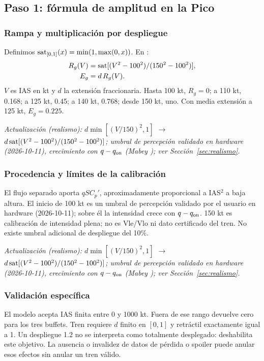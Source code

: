 \subsection{Paso 1: fórmula de amplitud en la Pico}
\subsubsection{Rampa y multiplicación por despliegue}
Definimos $\operatorname{sat}_{[0,1]}(x)=\min(1,\max(0,x))$. En :
\begin{align}
R_g(V)&=\operatorname{sat}[(V^2-100^2)/(150^2-100^2)],\\
E_g&=d\,R_g(V).
\label{eq:gear-env}
\end{align}
$V$ es IAS en kt y $d$ la extensión fraccionaria. Hasta 100 kt, $R_g=0$; a 110 kt, 0.168; a 125 kt, 0.45; a 140 kt, 0.768; desde 150 kt, uno. Con media extensión a 125 kt, $E_g=0.225$.

\textit{Actualización (realismo): $d\min[(V/150)^2,1]$ $\rightarrow$ $d\operatorname{sat}[(V^2-100^2)/(150^2-100^2)]$; umbral de percepción validado en hardware (2026-10-11), crecimiento con $q-q_{\rm on}$ (Mabey \cite{mabey1988}); ver Sección~\ref{sec:realismo}.}

\subsubsection{Procedencia y límites de la calibración}
El flujo separado aporta $qSC_p'$, aproximadamente proporcional a IAS$^2$ a baja altura. El inicio de 100 kt es un umbral de percepción validado por el usuario en hardware (2026-10-11); sobre él la intensidad crece con $q-q_{\rm on}$. 150 kt es calibración de intensidad plena; no es Vle/Vlo ni dato certificado del tren. No existe umbral adicional de despliegue del 10\%.

\textit{Actualización (realismo): $d\min[(V/150)^2,1]$ $\rightarrow$ $d\operatorname{sat}[(V^2-100^2)/(150^2-100^2)]$; umbral de percepción validado en hardware (2026-10-11), crecimiento con $q-q_{\rm on}$ (Mabey \cite{mabey1988}); ver Sección~\ref{sec:realismo}.}

\subsubsection{Validación específica}
El modelo acepta IAS finita entre 0 y 1000 kt. Fuera de ese rango devuelve cero para los tres buffets. Tren requiere $d$ finito en $[0,1]$ y retráctil exactamente igual a 1. Un despliegue 1.2 no se interpreta como totalmente desplegado: deshabilita este objetivo. La ausencia o invalidez de datos de pérdida o spoiler puede anular esos efectos sin anular un tren válido.

